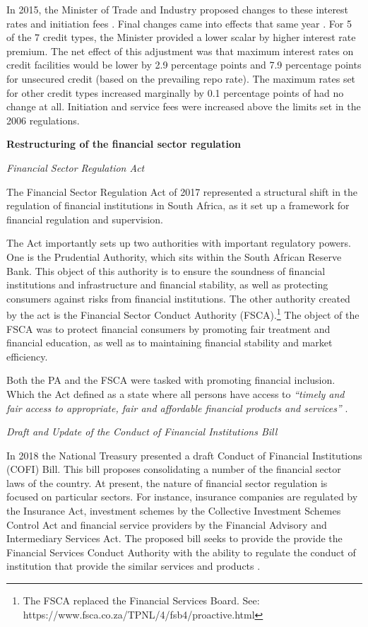 \documentclass[
  letterpaper,
  DIV=11,
  numbers=noendperiod]{scrartcl}
\begin{document}
In 2015, the Minister of Trade and Industry proposed changes to these
interest rates and initiation fees \citep{regulations2015b}. Final
changes came into effects that same year \citep{regulations2015c}. For 5
of the 7 credit types, the Minister provided a lower scalar by higher
interest rate premium. The net effect of this adjustment was that
maximum interest rates on credit facilities would be lower by 2.9
percentage points and 7.9 percentage points for unsecured credit (based
on the prevailing repo rate). The maximum rates set for other credit
types increased marginally by 0.1 percentage points of had no change at
all. Initiation and service fees were increased above the limits set in
the 2006 regulations.

\textbf{Restructuring of the financial sector regulation}

\emph{Financial Sector Regulation Act}

The Financial Sector Regulation Act of 2017 represented a structural
shift in the regulation of financial institutions in South Africa, as it
set up a framework for financial regulation and supervision.

The Act importantly sets up two authorities with important regulatory
powers. One is the Prudential Authority, which sits within the South
African Reserve Bank. This object of this authority is to ensure the
soundness of financial institutions and infrastructure and financial
stability, as well as protecting consumers against risks from financial
institutions. The other authority created by the act is the Financial
Sector Conduct Authority (FSCA).\footnote{The FSCA replaced the
  Financial Services Board. See:
  https://www.fsca.co.za/TPNL/4/fsb4/proactive.html} The object of the
FSCA was to protect financial consumers by promoting fair treatment and
financial education, as well as to maintaining financial stability and
market efficiency.

Both the PA and the FSCA were tasked with promoting financial inclusion.
Which the Act defined as a state where all persons have access to
\emph{``timely and fair access to appropriate, fair and affordable
financial products and services''} \citep{fsr2017}.

\emph{Draft and Update of the Conduct of Financial Institutions Bill}

In 2018 the National Treasury presented a draft Conduct of Financial
Institutions (COFI) Bill. This bill proposes consolidating a number of
the financial sector laws of the country. At present, the nature of
financial sector regulation is focused on particular sectors. For
instance, insurance companies are regulated by the Insurance Act,
investment schemes by the Collective Investment Schemes Control Act and
financial service providers by the Financial Advisory and Intermediary
Services Act. The proposed bill seeks to provide the provide the
Financial Services Conduct Authority with the ability to regulate the
conduct of institution that provide the similar services and products
\citep{cofi2018a}.
\end{document}
